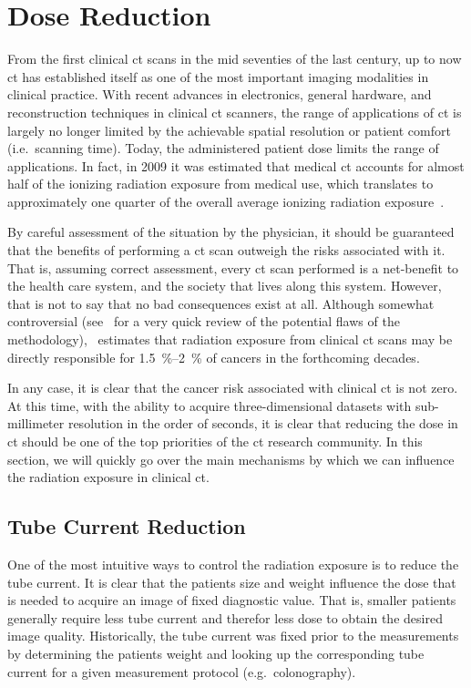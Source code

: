 \documentclass[../ml-ct.tex]{subfiles}
\begin{document}
\section{Dose Reduction}
From the first clinical \gls{ct} scans in the mid seventies of the last century, up to now \gls{ct} has established itself as one of the most important imaging modalities in clinical practice.
With recent advances in electronics, general hardware, and reconstruction techniques in clinical \gls{ct} scanners, the range of applications of \gls{ct} is largely no longer limited by the achievable spatial resolution or patient comfort (i.e.\ scanning time).
Today, the administered patient dose limits the range of applications.
In fact, in \num{2009} it was estimated that medical \gls{ct} accounts for almost half of the ionizing radiation exposure from medical use, which translates to approximately one quarter of the overall average ionizing radiation exposure~\cite{ncrp_ionizing_2009}.

By careful assessment of the situation by the physician, it should be guaranteed that the benefits of performing a \gls{ct} scan outweigh the risks associated with it.
That is, assuming correct assessment, every \gls{ct} scan performed is a net-benefit to the health care system, and the society that lives along this system.
However, that is not to say that no bad consequences exist at all.
Although somewhat controversial (see~\cite{yu_radiation_2009} for a very quick review of the potential flaws of the methodology),~\cite{brenner_computed_2007} estimates that radiation exposure from clinical \gls{ct} scans may be directly responsible for \SIrange{1.5}{2}{\percent} of cancers in the forthcoming decades.

In any case, it is clear that the cancer risk associated with clinical \gls{ct} is not zero.
At this time, with the ability to acquire three-dimensional datasets with sub-millimeter resolution in the order of seconds, it is clear that reducing the dose in \gls{ct} should be one of the top priorities of the \gls{ct} research community.
In this section, we will quickly go over the main mechanisms by which we can influence the radiation exposure in clinical \gls{ct}.
\subsection{Tube Current Reduction}
One of the most intuitive ways to control the radiation exposure is to reduce the tube current.
It is clear that the patients size and weight influence the dose that is needed to acquire an image of fixed diagnostic value.
That is, smaller patients generally require less tube current and therefor less dose to obtain the desired image quality.
Historically, the tube current was fixed prior to the measurements by determining the patients weight and looking up the corresponding tube current for a given measurement protocol (e.g.\ colonography).
\end{document}
